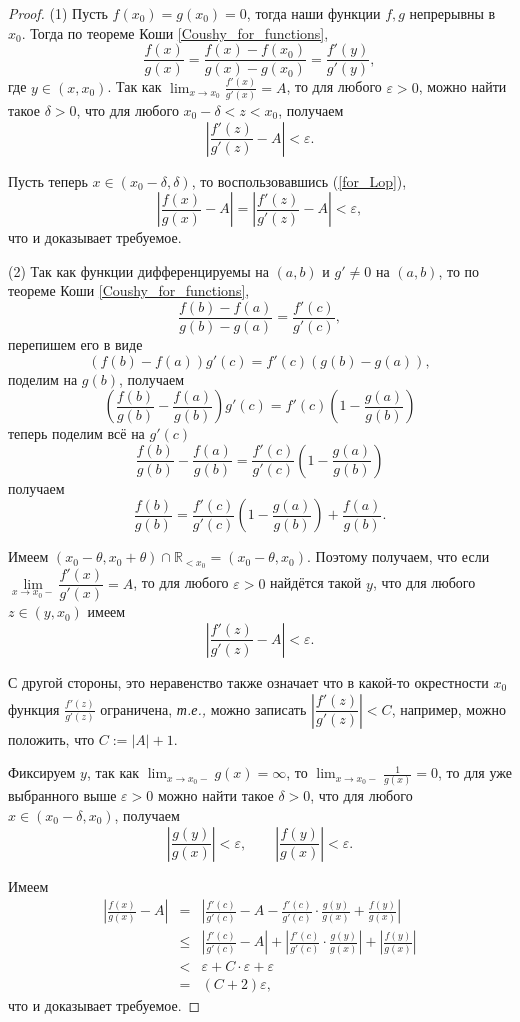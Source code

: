 \begin{proof}
(1) Пусть $f(x_0) = g(x_0) = 0$, тогда наши функции $f,g$ непрерывны в $x_0$. Тогда по теореме Коши \ref{Coushy_for_functions},
\begin{equation}\label{for_Lop}
 \frac{f(x)}{g(x)} = \frac{f(x) - f(x_0)}{g(x) - g(x_0)} = \frac{f'(y)}{g'(y)},    
\end{equation}
где $y \in (x, x_0)$. Так как $\lim_{x \to x_0} \frac{f'(x)}{g'(x)} = A$, то для любого $\varepsilon >0$, можно найти такое $\delta>0$, что для любого $x_0-\delta < z < x_0$, получаем
\[
\left| \frac{f'(z)}{g'(z)} -A\right| < \varepsilon.
\]

Пусть теперь $x \in (x_0 - \delta, \delta)$, то воспользовавшись (\ref{for_Lop}),
\[
 \left| \frac{f(x)}{g(x)} - A \right| = \left| \frac{f'(z)}{g'(z)} -A \right| < \varepsilon,
\]
что и доказывает требуемое.

(2) Так как функции дифференцируемы на $(a,b)$ и $g' \ne 0$ на $(a,b)$, то по теореме Коши \ref{Coushy_for_functions}, 
\[
\frac{f(b) -f(a)}{g(b) - g(a)} = \frac{f'(c)}{g'(c)},
\]
перепишем его в виде
\[
 (f(b) - f(a)) g'(c) = f'(c) (g(b) - g(a)),
\]
поделим на $g(b)$, получаем
\[
 \left(\frac{f(b)}{g(b)} - \frac{f(a)}{g(b)} \right) g'(c) = f'(c) \left(1 - \frac{g(a)}{g(b)} \right)
\]
теперь поделим всё на $g'(c)$
\[
 \frac{f(b)}{g(b)} - \frac{f(a)}{g(b)}  = \frac{f'(c)}{g'(c)}\left(1 - \frac{g(a)}{g(b)} \right)
\]
получаем
\[
 \frac{f(b)}{g(b)}  = \frac{f'(c)}{g'(c)}\left(1 - \frac{g(a)}{g(b)} \right) + \frac{f(a)}{g(b)}.
\]

Имеем $(x_0 - \theta, x_0 + \theta) \cap \mathbb{R}_{< x_0} = (x_0 -\theta, x_0).$ Поэтому получаем, что если $\lim\limits_{x \to x_0-} \dfrac{f'(x)}{g'(x)} = A$, то для любого $\varepsilon>0$ найдётся такой $y$, что для любого $z \in (y, x_0)$ имеем 
\[
 \left| \frac{f'(z)}{g'(z)} - A \right| < \varepsilon.
\]

С другой стороны, это неравенство также означает что в какой-то окрестности $x_0$ функция $\frac{f'(z)}{g'(z)}$ ограничена, \textit{т.е.,} можно записать $\left| \dfrac{f'(z)}{g'(z)} \right|<C$, например, можно положить, что $C:=|A|+1.$

Фиксируем $y$, так как $\lim_{x \to x_0-}g(x) = \infty$, то $\lim_{x \to x_0-}\frac{1}{g(x)} = 0$, то для уже выбранного выше $\varepsilon>0$ можно найти такое $\delta>0$, что для любого $x \in (x_0 - \delta, x_0)$, получаем
\[
 \left| \frac{g(y)}{g(x)} \right| < \varepsilon, \qquad \left| \frac{f(y)}{g(x)}  \right| < \varepsilon.
\]

Имеем
\begin{eqnarray*}
    \left| \frac{f(x)}{g(x)} -A\right| &=& \left| \frac{f'(c)}{g'(c)}- A - \frac{f'(c)}{g'(c)} \cdot \frac{g(y)}{g(x)}  + \frac{f(y)}{g(x)}\right| \\
    &\le & \left|\frac{f'(c)}{g'(c)}- A \right| + \left| \frac{f'(c)}{g'(c)} \cdot \frac{g(y)}{g(x)}\right| + \left|  \frac{f(y)}{g(x)}\right| \\
    &<& \varepsilon + C\cdot \varepsilon + \varepsilon \\
    &=& (C+2)\varepsilon,
\end{eqnarray*}
что и доказывает требуемое.
\end{proof}

